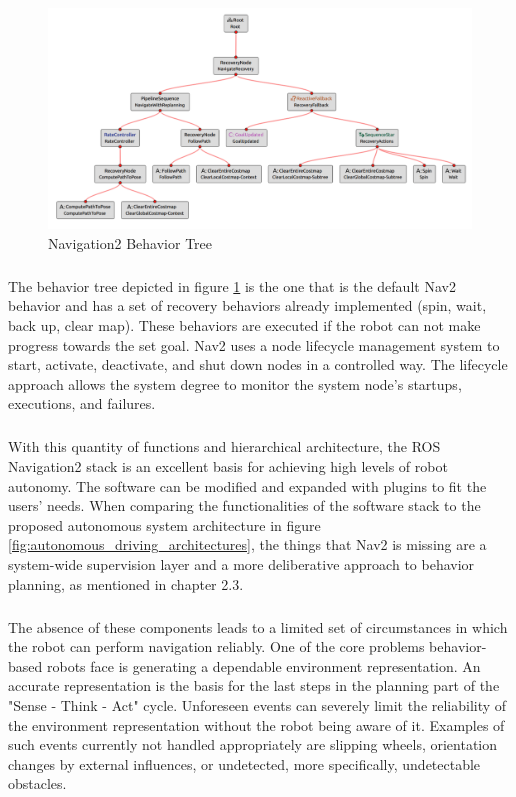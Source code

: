 \begin{figure}[ht]
	\includegraphics[width=1.0\textwidth]{images/nav_bt-modified.png}
	\caption{Navigation2 Behavior Tree}
	\label{fig:bt_nav}
\end{figure}
\subparagraph*{}
The behavior tree depicted in figure \ref{fig:bt_nav} is the one that is the default Nav2 behavior and has a set of recovery behaviors already implemented (spin, wait, back up, clear map). These behaviors are executed if the robot can not make progress towards the set goal. 
Nav2 uses a node lifecycle management system to start, activate, deactivate, and shut down nodes in a controlled way. The lifecycle approach allows the system degree to monitor the system node's startups, executions, and failures. 
\subparagraph*{}
With this quantity of functions and hierarchical architecture, the ROS Navigation2 stack is an excellent basis for achieving high levels of robot autonomy. The software can be modified and expanded with plugins to fit the users' needs. 
When comparing the functionalities of the software stack to the proposed autonomous system architecture in figure \ref{fig:autonomous_driving_architectures}, the things that Nav2 is missing are a system-wide supervision layer and a more deliberative approach to behavior planning, as mentioned in chapter 2.3.
\subparagraph*{}
The absence of these components leads to a limited set of circumstances in which the robot can perform navigation reliably. One of the core problems behavior-based robots face is generating a dependable environment representation. An accurate representation is the basis for the last steps in the planning part of the "Sense - Think - Act" cycle. Unforeseen events can severely limit the reliability of the environment representation without the robot being aware of it. Examples of such events currently not handled appropriately are slipping wheels, orientation changes by external influences, or undetected, more specifically, undetectable obstacles. 
